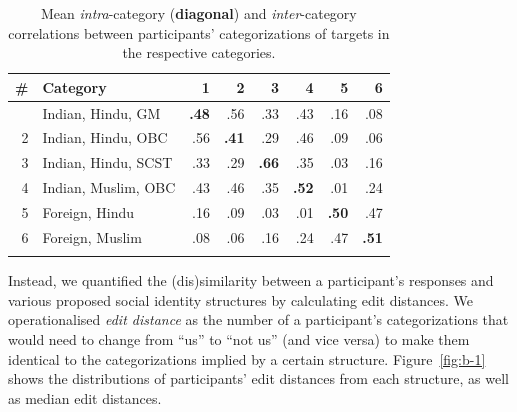 \documentclass[12pt, a4paper]{article}
\begin{document}
\begin{table}
\centering
{}
\caption[Mean intra and inter-category correlations for target categorizations]{Mean \emph{intra}-category (\textbf{diagonal}) and \emph{inter}-category correlations between participants' categorizations of targets in the respective categories.}
\small	
\begin{tabular}{rlrrrr|rr} \toprule
\# & Category            & 1   & 2   & 3   & 4   & 5   & 6   \\ \midrule \addlinespace
1  & Indian, Hindu, GM   & \textbf{.48} & .56 & .33 & .43 & .16 & .08 \\
2  & Indian, Hindu, OBC  & .56 & \textbf{.41} & .29 & .46 & .09 & .06 \\
3  & Indian, Hindu, SCST & .33 & .29 & \textbf{.66} & .35 & .03 & .16 \\
4  & Indian, Muslim, OBC & .43 & .46 & .35 & \textbf{.52} & .01 & .24 \\ \midrule
5  & Foreign, Hindu      & .16 & .09 & .03 & .01 & \textbf{.50} & .47 \\
6  & Foreign, Muslim     & .08 & .06 & .16 & .24 & .47 & \textbf{.51} \\ \addlinespace \bottomrule
\end{tabular}
\label{tab:ch4-s4-2}
\end{table}

Instead, we quantified the (dis)similarity between a participant's responses and various proposed social identity structures by calculating edit distances. We operationalised \emph{edit distance} as the number of a participant's categorizations that would need to change from ``us'' to ``not us'' (and vice versa) to make them identical to the categorizations implied by a certain structure. Figure~\ref{fig:b-1} shows the distributions of participants' edit distances from each structure, as well as median edit distances. 
\end{document}
